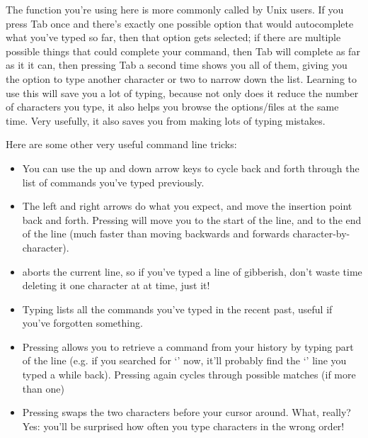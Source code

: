 The  function you're using here is more commonly called  by Unix users. If you press Tab once and there's exactly one possible option that would autocomplete what you've typed so far, then that option gets selected; if there are multiple possible things that could complete your command, then Tab will complete as far as it it can, then pressing Tab a second time shows you all of them, giving you the option to type another character or two to narrow down the list. Learning to use this will save you a lot of typing, because not only does it reduce the number of characters you type, it also helps you browse the options/files at the same time. Very usefully, it also saves you from making lots of typing mistakes.



Here are some other very useful command line tricks:

\begin{itemize}
\item You can use the up and down arrow keys to cycle back and forth through the list of commands you've typed previously.
\item The left and right arrows do what you expect, and move the insertion point back and forth. Pressing  will move you to the start of the line, and  to the end of the line (much faster than moving backwards and forwards character-by-character). 
\item {} aborts the current line, so if you've typed a line of gibberish, don't waste time deleting it one character at at time, just  it!
\item Typing  lists all the commands you've typed in the recent past, useful if you've forgotten something.
\item Pressing  allows you to retrieve a command from your history by typing part of the line (e.g. if you searched for `' now, it'll probably find the `' line you typed a while back). Pressing  again cycles through possible matches (if more than one)
\item Pressing  swaps the two characters before your cursor around. What, really? Yes: you'll be surprised how often you type characters in the wrong order! 
\end{itemize}

